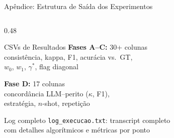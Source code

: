 \documentclass[aspectratio=169, 8pt]{beamer}
\begin{document}
\begin{frame}{Apêndice: Estrutura de Saída dos Experimentos}
  \begin{columns}[T]


    \begin{column}{0.48\textwidth}
      \begin{block}{CSVs de Resultados}
        \textbf{Fases A--C:} 30+ colunas\\
        consistência, kappa, F1, acurácia vs.\ GT,\\
        $w_0$, $w_1$, $\gamma^*$, flag diagonal

        \vspace{0.4em}
        \textbf{Fase D:} 17 colunas\\
        concordância LLM--perito ($\kappa$, F1),\\
        estratégia, $n$-shot, repetição
      \end{block}

      \vspace{0.3em}

      \begin{block}{Log completo}
        \texttt{log\_execucao.txt}: transcript completo\\
        com detalhes algorítmicos e métricas por ponto
      \end{block}
    \end{column}
  \end{columns}
\end{frame}
\end{document}
